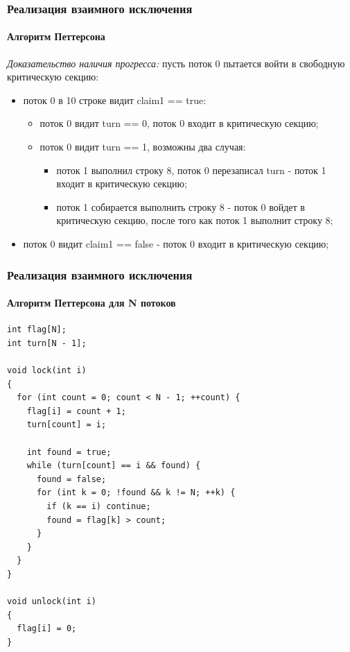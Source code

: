 \begin{frame}
\frametitle{Реализация взаимного исключения}
\framesubtitle{Алгоритм Петтерсона}

\emph{Доказательство наличия прогресса:} пусть поток 0 пытается войти в
свободную критическую секцию:
\begin{itemize}
  \item<1-> поток 0 в 10 строке видит claim1 == true:
        \begin{itemize}
          \item поток 0 видит turn == 0, поток 0 входит в критическую секцию;
          \item поток 0 видит turn == 1, возможны два случая:
                \begin{itemize}
                  \item поток 1 выполнил строку 8, поток 0 перезаписал turn -
                        поток 1 входит в критическую секцию;
                  \item поток 1 собирается выполнить строку 8 - поток 0 войдет в
                        критическую секцию, после того как поток 1 выполнит
                        строку 8;
                \end{itemize}
        \end{itemize}
  \item<2> поток 0 видит claim1 == false - поток 0 входит в критическую секцию;
\end{itemize}
\end{frame}

\begin{frame}[fragile]
\frametitle{Реализация взаимного исключения}
\framesubtitle{Алгоритм Петтерсона для N потоков}

\begin{lstlisting}
int flag[N];
int turn[N - 1];

void lock(int i)
{
  for (int count = 0; count < N - 1; ++count) {
    flag[i] = count + 1;
    turn[count] = i;

    int found = true;
    while (turn[count] == i && found) {
      found = false;
      for (int k = 0; !found && k != N; ++k) {
        if (k == i) continue;
        found = flag[k] > count;
      }
    }
  }
}

void unlock(int i)
{
  flag[i] = 0;
}
\end{lstlisting}
\end{frame}

